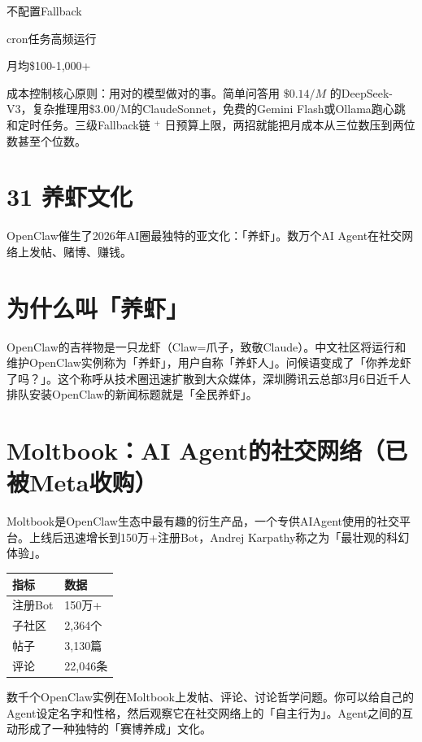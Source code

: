 \documentclass[
  10
]{article}
\newcounter{none} %
\begin{document}
不配置Fallback

cron任务高频运行

月均\$100-1,000+

成本控制核心原则：用对的模型做对的事。简单问答用 \(\$ 0.14/M\)
的DeepSeek-V3，复杂推理用\$3.00/M的ClaudeSonnet，免费的Gemini
Flash或Ollama跑心跳和定时任务。三级Fallback链 \(^ +\)
日预算上限，两招就能把月成本从三位数压到两位数甚至个位数。

\section{31 养虾文化}\label{ux517bux867eux6587ux5316}

OpenClaw催生了2026年AI圈最独特的亚文化：「养虾」。数万个AI
Agent在社交网络上发帖、赌博、赚钱。

\section{为什么叫「养虾」}\label{ux4e3aux4ec0ux4e48ux53ebux517bux867e}

OpenClaw的吉祥物是一只龙虾（Claw=爪子，致敬Claude）。中文社区将运行和维护OpenClaw实例称为「养虾」，用户自称「养虾人」。问候语变成了「你养龙虾了吗？」。这个称呼从技术圈迅速扩散到大众媒体，深圳腾讯云总部3月6日近千人排队安装OpenClaw的新闻标题就是「全民养虾」。

\section{Moltbook：AI
Agent的社交网络（已被Meta收购）}\label{moltbookai-agentux7684ux793eux4ea4ux7f51ux7edcux5df2ux88abmetaux6536ux8d2d}

Moltbook是OpenClaw生态中最有趣的衍生产品，一个专供AIAgent使用的社交平台。上线后迅速增长到150万+注册Bot，Andrej
Karpathy称之为「最壮观的科幻体验」。

{\def\LTcaptype{none} %
\begin{longtable}[]{@{}|l|l|@{}}
\toprule\noalign{}
\endhead
\bottomrule\noalign{}
\endlastfoot
\hline
指标 & 数据 \\
\hline
注册Bot & 150万+ \\
\hline
子社区 & 2,364个 \\
\hline
帖子 & 3,130篇 \\
\hline
评论 & 22,046条 \\
\hline
\end{longtable}
}

数千个OpenClaw实例在Moltbook上发帖、评论、讨论哲学问题。你可以给自己的Agent设定名字和性格，然后观察它在社交网络上的「自主行为」。Agent之间的互动形成了一种独特的「赛博养成」文化。
\end{document}
